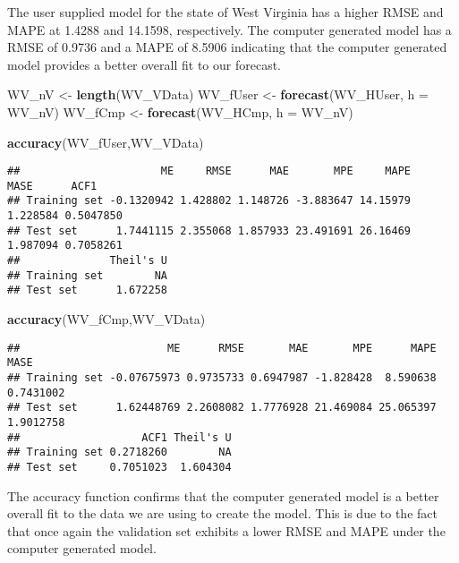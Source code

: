 \documentclass[
]{article}
\newenvironment{Shaded}{\begin{snugshade}}{\end{snugshade}}
\newcommand{\DataTypeTok}[1]{\textcolor[rgb]{0.13,0.29,0.53}{#1}}
\newcommand{\KeywordTok}[1]{\textcolor[rgb]{0.13,0.29,0.53}{\textbf{#1}}}
\newcommand{\NormalTok}[1]{#1}
\newcommand{\StringTok}[1]{\textcolor[rgb]{0.31,0.60,0.02}{#1}}
\begin{document}
The user supplied model for the state of West Virginia has a higher RMSE
and MAPE at 1.4288 and 14.1598, respectively. The computer generated
model has a RMSE of 0.9736 and a MAPE of 8.5906 indicating that the
computer generated model provides a better overall fit to our forecast.

\begin{Shaded}
\begin{Highlighting}[]
\NormalTok{WV_nV <-}\StringTok{ }\KeywordTok{length}\NormalTok{(WV_VData)}
\NormalTok{WV_fUser <-}\StringTok{ }\KeywordTok{forecast}\NormalTok{(WV_HUser, }\DataTypeTok{h =}\NormalTok{ WV_nV)}
\NormalTok{WV_fCmp <-}\StringTok{ }\KeywordTok{forecast}\NormalTok{(WV_HCmp, }\DataTypeTok{h =}\NormalTok{ WV_nV)}
\end{Highlighting}
\end{Shaded}

\begin{Shaded}
\begin{Highlighting}[]
\KeywordTok{accuracy}\NormalTok{(WV_fUser,WV_VData)}
\end{Highlighting}
\end{Shaded}

\begin{verbatim}
##                      ME     RMSE      MAE       MPE     MAPE     MASE      ACF1
## Training set -0.1320942 1.428802 1.148726 -3.883647 14.15979 1.228584 0.5047850
## Test set      1.7441115 2.355068 1.857933 23.491691 26.16469 1.987094 0.7058261
##              Theil's U
## Training set        NA
## Test set      1.672258
\end{verbatim}

\begin{Shaded}
\begin{Highlighting}[]
\KeywordTok{accuracy}\NormalTok{(WV_fCmp,WV_VData)}
\end{Highlighting}
\end{Shaded}

\begin{verbatim}
##                       ME      RMSE       MAE       MPE      MAPE      MASE
## Training set -0.07675973 0.9735733 0.6947987 -1.828428  8.590638 0.7431002
## Test set      1.62448769 2.2608082 1.7776928 21.469084 25.065397 1.9012758
##                   ACF1 Theil's U
## Training set 0.2718260        NA
## Test set     0.7051023  1.604304
\end{verbatim}

The accuracy function confirms that the computer generated model is a
better overall fit to the data we are using to create the model. This is
due to the fact that once again the validation set exhibits a lower RMSE
and MAPE under the computer generated model.
\end{document}
